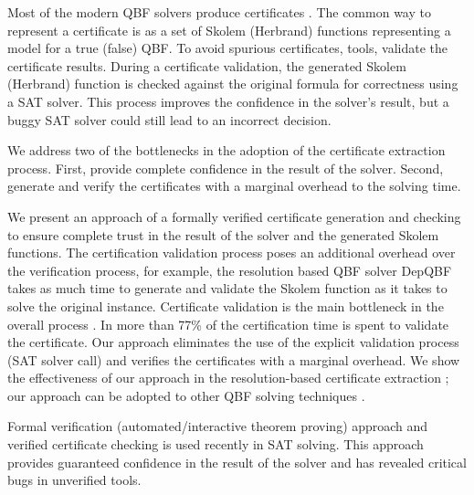 \documentclass[runningheads]{llncs}
\newcommand{\0}{0}
\newcommand{\1}{1}
\begin{document}
Most of the modern QBF solvers produce certificates \cite{Balabanov2015, RabeS16, BalabanovJ12, Benedetti05, NarizzanoPPT09, NiemetzPLSB12, JussilaBSKW07, GoultiaevaGB11, Van2013, HeuleSB17}. The common way to represent a certificate is as a set of Skolem (Herbrand) functions representing a model for a true (false) QBF. To avoid spurious certificates, tools, validate the certificate results. During a certificate validation, the generated Skolem (Herbrand) function is checked against the original formula for correctness using a SAT solver. This process improves the confidence in the solver's result, but a buggy SAT solver could still lead to an incorrect decision. 



We address two of the bottlenecks in the adoption of the certificate extraction process. First, provide complete confidence in the result of the solver. Second, generate and verify the certificates with a marginal overhead to the solving time. 

We present an approach of a formally verified certificate generation and checking to ensure complete trust in the result of the solver and the generated Skolem functions. The certification validation process poses an additional overhead over the verification process, for example, the resolution based QBF solver DepQBF \cite{LonsingB10} takes as much time to generate and validate the Skolem function as it takes to solve the original instance. Certificate validation is the main bottleneck in the overall process \cite{NiemetzPLSB12}. In \cite{NiemetzPLSB12} more than 77\% of the certification time is spent to validate the certificate. Our approach eliminates the use of the explicit validation process (SAT solver call) and verifies the certificates with a marginal overhead. We show the effectiveness of our approach in the resolution-based certificate extraction \cite{NiemetzPLSB12}; our approach can be adopted to other QBF solving techniques \cite{RabeT15}.

Formal verification (automated/interactive theorem proving) approach \cite{Fleury2018a, Fleury2019a, BlanchetteFLW18} and verified certificate checking \cite{Cruz2017, Cruz2017b, Heule2017a, Lammich17} is used recently in SAT solving. This approach provides guaranteed confidence in the result of the solver and has revealed critical bugs \cite{Lammich17} in unverified tools. 
\end{document}
